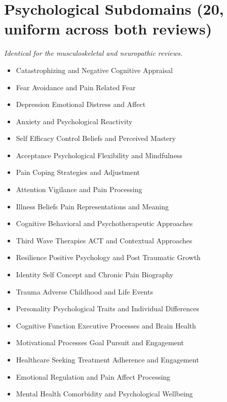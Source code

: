 \documentclass[11pt]{article}
\begin{document}
\section*{Psychological Subdomains (20, uniform across both reviews)}
{\small\itshape Identical for the musculoskeletal and neuropathic reviews.}\par\smallskip
\begin{itemize}
\item Catastrophizing and Negative Cognitive Appraisal
\item Fear Avoidance and Pain Related Fear
\item Depression Emotional Distress and Affect
\item Anxiety and Psychological Reactivity
\item Self Efficacy Control Beliefs and Perceived Mastery
\item Acceptance Psychological Flexibility and Mindfulness
\item Pain Coping Strategies and Adjustment
\item Attention Vigilance and Pain Processing
\item Illness Beliefs Pain Representations and Meaning
\item Cognitive Behavioral and Psychotherapeutic Approaches
\item Third Wave Therapies ACT and Contextual Approaches
\item Resilience Positive Psychology and Post Traumatic Growth
\item Identity Self Concept and Chronic Pain Biography
\item Trauma Adverse Childhood and Life Events
\item Personality Psychological Traits and Individual Differences
\item Cognitive Function Executive Processes and Brain Health
\item Motivational Processes Goal Pursuit and Engagement
\item Healthcare Seeking Treatment Adherence and Engagement
\item Emotional Regulation and Pain Affect Processing
\item Mental Health Comorbidity and Psychological Wellbeing
\end{itemize}
\end{document}

